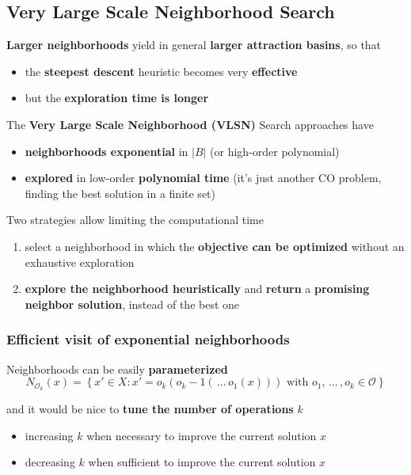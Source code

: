 
\newpage

\subsection{Very Large Scale Neighborhood Search}
\textbf{Larger neighborhoods} yield in general \textbf{larger attraction basins}, so that
\begin{itemize}
	\item the \textbf{steepest descent} heuristic becomes very \textbf{effective}
	\item but the \textbf{exploration time is longer}
\end{itemize}

The \textbf{Very Large Scale Neighborhood (VLSN)} Search approaches have
\begin{itemize}
	\item \textbf{neighborhoods exponential} in $|B|$ (or high-order polynomial)
	\item \textbf{explored} in low-order \textbf{polynomial time} (it's just another CO problem, finding the best solution in a finite set)
\end{itemize}

Two strategies allow limiting the computational time
\begin{enumerate}
	\item select a neighborhood in which the \textbf{objective can be optimized} without an exhaustive exploration
	\item \textbf{explore the neighborhood heuristically} and \textbf{return} a \textbf{promising neighbor solution}, instead of the best one
\end{enumerate}

\newpage

\subsubsection{Efficient visit of exponential neighborhoods}

Neighborhoods can be easily \textbf{parameterized}
$$ N_{\mathcal{O}_k} (x) = \left\{ x' \in X : x' = o_k (o_k−1 (\, ... \, o_1 (x))) \text{ with } o_1, \, ... \, , o_k \in \mathcal{O} \right\} $$

and it would be nice to \textbf{tune the number of operations} $k$
\begin{itemize}
	\item increasing $k$ when necessary to improve the current solution $x$
	
	\item decreasing $k$ when sufficient to improve the current solution $x$
\end{itemize}

